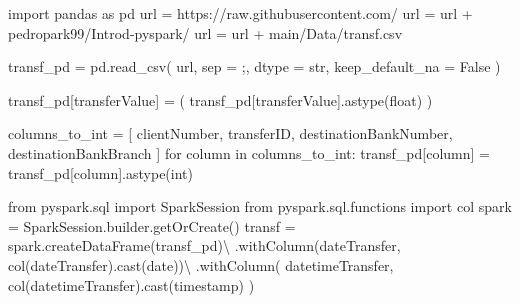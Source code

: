 \documentclass[
  11pt,
  letterpaper,
  DIV=11,
  numbers=noendperiod]{scrreprt}
\newenvironment{Shaded}{\begin{snugshade}}{\end{snugshade}}
\newcommand{\BuiltInTok}[1]{\textcolor[rgb]{0.00,0.23,0.31}{#1}}
\newcommand{\ControlFlowTok}[1]{\textcolor[rgb]{0.00,0.23,0.31}{#1}}
\newcommand{\ImportTok}[1]{\textcolor[rgb]{0.00,0.46,0.62}{#1}}
\newcommand{\KeywordTok}[1]{\textcolor[rgb]{0.00,0.23,0.31}{#1}}
\newcommand{\NormalTok}[1]{\textcolor[rgb]{0.00,0.23,0.31}{#1}}
\newcommand{\OperatorTok}[1]{\textcolor[rgb]{0.37,0.37,0.37}{#1}}
\newcommand{\StringTok}[1]{\textcolor[rgb]{0.13,0.47,0.30}{#1}}
\newcommand{\VariableTok}[1]{\textcolor[rgb]{0.07,0.07,0.07}{#1}}
\begin{document}
\begin{Shaded}
\begin{Highlighting}[]
\ImportTok{import}\NormalTok{ pandas }\ImportTok{as}\NormalTok{ pd}
\NormalTok{url }\OperatorTok{=} \StringTok{\textquotesingle{}https://raw.githubusercontent.com/\textquotesingle{}}
\NormalTok{url }\OperatorTok{=}\NormalTok{ url }\OperatorTok{+} \StringTok{\textquotesingle{}pedropark99/Introd{-}pyspark/\textquotesingle{}}
\NormalTok{url }\OperatorTok{=}\NormalTok{ url }\OperatorTok{+} \StringTok{\textquotesingle{}main/Data/transf.csv\textquotesingle{}}

\NormalTok{transf\_pd }\OperatorTok{=}\NormalTok{ pd.read\_csv(}
\NormalTok{  url, sep }\OperatorTok{=} \StringTok{\textquotesingle{};\textquotesingle{}}\NormalTok{,}
\NormalTok{  dtype }\OperatorTok{=} \BuiltInTok{str}\NormalTok{,}
\NormalTok{  keep\_default\_na }\OperatorTok{=} \VariableTok{False}
\NormalTok{)}

\NormalTok{transf\_pd[}\StringTok{\textquotesingle{}transferValue\textquotesingle{}}\NormalTok{] }\OperatorTok{=}\NormalTok{ (}
\NormalTok{  transf\_pd[}\StringTok{\textquotesingle{}transferValue\textquotesingle{}}\NormalTok{].astype(}\StringTok{\textquotesingle{}float\textquotesingle{}}\NormalTok{)}
\NormalTok{)}

\NormalTok{columns\_to\_int }\OperatorTok{=}\NormalTok{ [}
  \StringTok{\textquotesingle{}clientNumber\textquotesingle{}}\NormalTok{,}
  \StringTok{\textquotesingle{}transferID\textquotesingle{}}\NormalTok{,}
  \StringTok{\textquotesingle{}destinationBankNumber\textquotesingle{}}\NormalTok{,}
  \StringTok{\textquotesingle{}destinationBankBranch\textquotesingle{}}
\NormalTok{]}
\ControlFlowTok{for}\NormalTok{ column }\KeywordTok{in}\NormalTok{ columns\_to\_int:}
\NormalTok{  transf\_pd[column] }\OperatorTok{=}\NormalTok{ transf\_pd[column].astype(}\StringTok{\textquotesingle{}int\textquotesingle{}}\NormalTok{)}

\ImportTok{from}\NormalTok{ pyspark.sql }\ImportTok{import}\NormalTok{ SparkSession}
\ImportTok{from}\NormalTok{ pyspark.sql.functions }\ImportTok{import}\NormalTok{ col}
\NormalTok{spark }\OperatorTok{=}\NormalTok{ SparkSession.builder.getOrCreate()}
\NormalTok{transf }\OperatorTok{=}\NormalTok{ spark.createDataFrame(transf\_pd)}\OperatorTok{\textbackslash{}}
\NormalTok{  .withColumn(}\StringTok{\textquotesingle{}dateTransfer\textquotesingle{}}\NormalTok{, col(}\StringTok{\textquotesingle{}dateTransfer\textquotesingle{}}\NormalTok{).cast(}\StringTok{\textquotesingle{}date\textquotesingle{}}\NormalTok{))}\OperatorTok{\textbackslash{}}
\NormalTok{  .withColumn(}
    \StringTok{\textquotesingle{}datetimeTransfer\textquotesingle{}}\NormalTok{,}
\NormalTok{    col(}\StringTok{\textquotesingle{}datetimeTransfer\textquotesingle{}}\NormalTok{).cast(}\StringTok{\textquotesingle{}timestamp\textquotesingle{}}\NormalTok{)}
\NormalTok{  )}
\end{Highlighting}
\end{Shaded}
\end{document}
